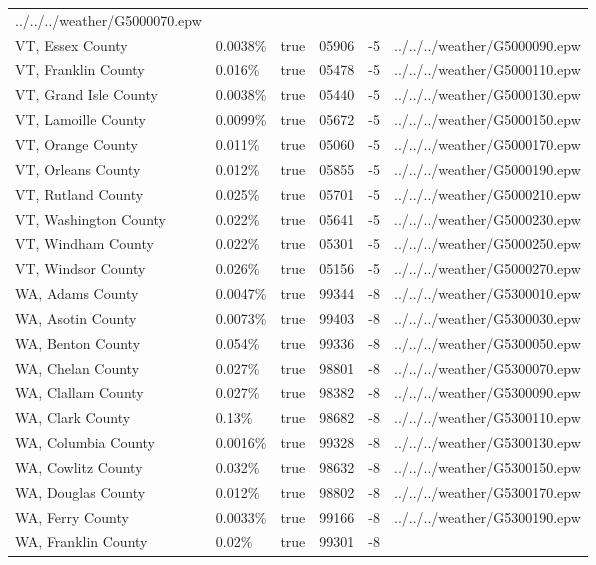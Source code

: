 \begin{longtable}[]{@{}llllll@{}}
../../../weather/G5000070.epw \\
VT, Essex County & 0.0038\% & true & 05906 & -5 &
../../../weather/G5000090.epw \\
VT, Franklin County & 0.016\% & true & 05478 & -5 &
../../../weather/G5000110.epw \\
VT, Grand Isle County & 0.0038\% & true & 05440 & -5 &
../../../weather/G5000130.epw \\
VT, Lamoille County & 0.0099\% & true & 05672 & -5 &
../../../weather/G5000150.epw \\
VT, Orange County & 0.011\% & true & 05060 & -5 &
../../../weather/G5000170.epw \\
VT, Orleans County & 0.012\% & true & 05855 & -5 &
../../../weather/G5000190.epw \\
VT, Rutland County & 0.025\% & true & 05701 & -5 &
../../../weather/G5000210.epw \\
VT, Washington County & 0.022\% & true & 05641 & -5 &
../../../weather/G5000230.epw \\
VT, Windham County & 0.022\% & true & 05301 & -5 &
../../../weather/G5000250.epw \\
VT, Windsor County & 0.026\% & true & 05156 & -5 &
../../../weather/G5000270.epw \\
WA, Adams County & 0.0047\% & true & 99344 & -8 &
../../../weather/G5300010.epw \\
WA, Asotin County & 0.0073\% & true & 99403 & -8 &
../../../weather/G5300030.epw \\
WA, Benton County & 0.054\% & true & 99336 & -8 &
../../../weather/G5300050.epw \\
WA, Chelan County & 0.027\% & true & 98801 & -8 &
../../../weather/G5300070.epw \\
WA, Clallam County & 0.027\% & true & 98382 & -8 &
../../../weather/G5300090.epw \\
WA, Clark County & 0.13\% & true & 98682 & -8 &
../../../weather/G5300110.epw \\
WA, Columbia County & 0.0016\% & true & 99328 & -8 &
../../../weather/G5300130.epw \\
WA, Cowlitz County & 0.032\% & true & 98632 & -8 &
../../../weather/G5300150.epw \\
WA, Douglas County & 0.012\% & true & 98802 & -8 &
../../../weather/G5300170.epw \\
WA, Ferry County & 0.0033\% & true & 99166 & -8 &
../../../weather/G5300190.epw \\
WA, Franklin County & 0.02\% & true & 99301 & -8 &

\end{longtable}
